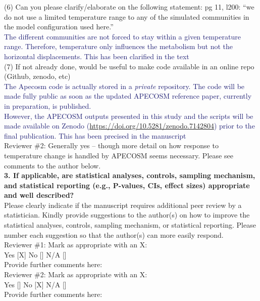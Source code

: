 \documentclass[12pt]{article}
\newcommand{\resp}[1]{\textcolor{MidnightBlue}{#1}}
\begin{document}
(6) Can you please clarify/elaborate on the following statement: pg 11, l200: “we do not use a limited temperature range to any of the simulated communities in the model configuration used here.” \\

\resp{The different communities are not forced to stay within a given temperature range. Therefore, temperature
only influences the metabolism but not the horizontal displacements. This has been clarified in the text} \\

(7) If not already done, would be useful to make code available in an online repo (Github, zenodo, etc) \\ 

\resp{The Apecosm code is actually stored in a \emph{private} repository. The code will be made fully public as soon as the updated APECOSM reference paper, currently in preparation, is published.} \\

\resp{However, the APECOSM outputs presented in this study and the scripts will be made available on Zenodo (\url{https://doi.org/10.5281/zenodo.7142804}) prior to the final publication. This has been precised in the manuscript} \\

Reviewer \#2: Generally yes -- though more detail on how response to temperature change is handled by APECOSM seems necessary. Please see comments to the author below. \\

\textbf{3. If applicable, are statistical analyses, controls, sampling mechanism, and statistical reporting (e.g., P-values, CIs, effect sizes) appropriate and well described?} \\

Please clearly indicate if the manuscript requires additional peer review by a statistician. Kindly provide suggestions to the author(s) on how to improve the statistical analyses, controls, sampling mechanism, or statistical reporting. Please number each suggestion so that the author(s) can more easily respond.\\

Reviewer \#1: Mark as appropriate with an X:\\
Yes [X] No [] N/A []\\
Provide further comments here:\\

Reviewer \#2: Mark as appropriate with an X:\\
Yes [] No [X] N/A []\\
Provide further comments here:\\
\end{document}
